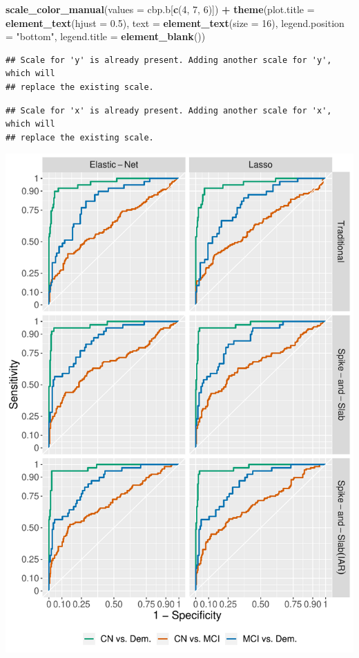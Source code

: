 \documentclass[
]{article}
\newenvironment{Shaded}{\begin{snugshade}}{\end{snugshade}}
\newcommand{\DataTypeTok}[1]{\textcolor[rgb]{0.13,0.29,0.53}{#1}}
\newcommand{\DecValTok}[1]{\textcolor[rgb]{0.00,0.00,0.81}{#1}}
\newcommand{\FloatTok}[1]{\textcolor[rgb]{0.00,0.00,0.81}{#1}}
\newcommand{\KeywordTok}[1]{\textcolor[rgb]{0.13,0.29,0.53}{\textbf{#1}}}
\newcommand{\NormalTok}[1]{#1}
\newcommand{\OperatorTok}[1]{\textcolor[rgb]{0.81,0.36,0.00}{\textbf{#1}}}
\newcommand{\StringTok}[1]{\textcolor[rgb]{0.31,0.60,0.02}{#1}}
\begin{document}
\begin{Shaded}
\begin{Highlighting}[]
\StringTok{  }\KeywordTok{scale_color_manual}\NormalTok{(}\DataTypeTok{values =}\NormalTok{ cbp.b[}\KeywordTok{c}\NormalTok{(}\DecValTok{4}\NormalTok{, }\DecValTok{7}\NormalTok{, }\DecValTok{6}\NormalTok{)]) }\OperatorTok{+}
\StringTok{  }\KeywordTok{theme}\NormalTok{(}\DataTypeTok{plot.title =} \KeywordTok{element_text}\NormalTok{(}\DataTypeTok{hjust =} \FloatTok{0.5}\NormalTok{), }
        \DataTypeTok{text =} \KeywordTok{element_text}\NormalTok{(}\DataTypeTok{size =} \DecValTok{16}\NormalTok{),}
        \DataTypeTok{legend.position =} \StringTok{"bottom"}\NormalTok{,}
        \DataTypeTok{legend.title =} \KeywordTok{element_blank}\NormalTok{()) }
\end{Highlighting}
\end{Shaded}

\begin{verbatim}
## Scale for 'y' is already present. Adding another scale for 'y', which will
## replace the existing scale.
\end{verbatim}

\begin{verbatim}
## Scale for 'x' is already present. Adding another scale for 'x', which will
## replace the existing scale.
\end{verbatim}

\includegraphics{analysis_details_files/figure-latex/unnamed-chunk-31-1.pdf}
\end{document}
